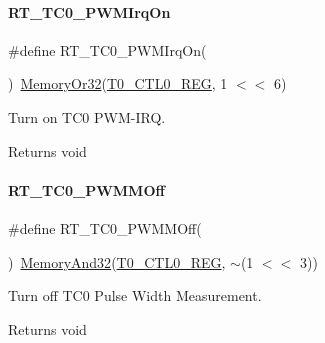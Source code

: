 \paragraph{\texorpdfstring{R\+T\+\_\+\+T\+C0\+\_\+\+P\+W\+M\+Irq\+On}{RT\_TC0\_PWMIrqOn}}
{\footnotesize\ttfamily \#define R\+T\+\_\+\+T\+C0\+\_\+\+P\+W\+M\+Irq\+On(\begin{DoxyParamCaption}{ }\end{DoxyParamCaption})~\mbox{\hyperlink{a00020_a27874a97deab7cecdde5ddecf466e31e}{Memory\+Or32}}(\mbox{\hyperlink{a00020_adadaa0ab1ebbd7ba9b70dfd24c3ed44da869abf9d87f78f45a0e07ad352abb39e}{T0\+\_\+\+C\+T\+L0\+\_\+\+R\+EG}}, 1 $<$$<$ 6)}



Turn on T\+C0 P\+W\+M-\/\+I\+RQ. 

\begin{DoxyReturn}{Returns}
void 
\end{DoxyReturn}
\mbox{\label{a00041_ab3d4fe7b156ef14b033ad020108fa386}} 
\paragraph{\texorpdfstring{R\+T\+\_\+\+T\+C0\+\_\+\+P\+W\+M\+M\+Off}{RT\_TC0\_PWMMOff}}
{\footnotesize\ttfamily \#define R\+T\+\_\+\+T\+C0\+\_\+\+P\+W\+M\+M\+Off(\begin{DoxyParamCaption}{ }\end{DoxyParamCaption})~\mbox{\hyperlink{a00020_ad87cedffcaadc51db22594fce55173d4}{Memory\+And32}}(\mbox{\hyperlink{a00020_adadaa0ab1ebbd7ba9b70dfd24c3ed44da869abf9d87f78f45a0e07ad352abb39e}{T0\+\_\+\+C\+T\+L0\+\_\+\+R\+EG}}, $\sim$(1 $<$$<$ 3))}



Turn off T\+C0 Pulse Width Measurement. 

\begin{DoxyReturn}{Returns}
void 
\end{DoxyReturn}
\mbox{\label{a00041_aac1f2943fc99c1197cda6bc5c0fce669}} 

